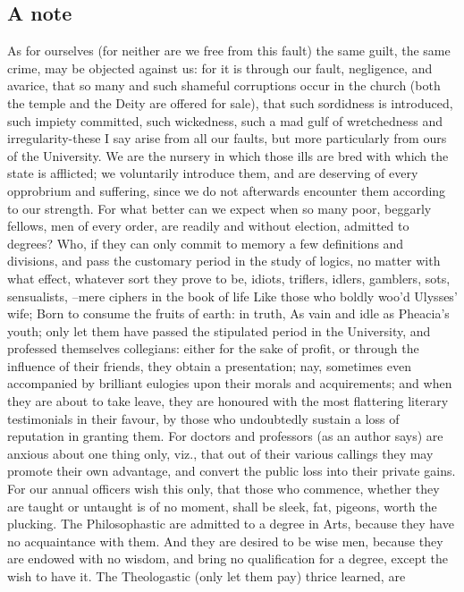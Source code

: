 {{\subsection{A note}
{
As for ourselves (for neither are we free from this fault) the same guilt, the
same crime, may be objected against us: for it is through our fault,
negligence, and avarice, that so many and such shameful corruptions occur in
the church (both the temple and the Deity are offered for sale), that such
sordidness is introduced, such impiety committed, such wickedness, such a mad
gulf of wretchedness and irregularity-these I say arise from all our faults,
but more particularly from ours of the University. We are the nursery in which
those ills are bred with which the state is afflicted; we voluntarily introduce
them, and are deserving of every opprobrium and suffering, since we do not
afterwards encounter them according to our strength. For what better can we
expect when so many poor, beggarly fellows, men of every order, are readily and
without election, admitted to degrees? Who, if they can only commit to memory a
few definitions and divisions, and pass the customary period in the study of
logics, no matter with what effect, whatever sort they prove to be, idiots,
triflers, idlers, gamblers, sots, sensualists, --mere ciphers in the book of
life Like those who boldly woo'd Ulysses' wife; Born to consume the fruits of
earth: in truth, As vain and idle as Pheacia's youth; only let them have passed
the stipulated period in the University, and professed themselves collegians:
either for the sake of profit, or through the influence of their friends, they
obtain a presentation; nay, sometimes even accompanied by brilliant eulogies
upon their morals and acquirements; and when they are about to take leave, they
are honoured with the most flattering literary testimonials in their favour, by
those who undoubtedly sustain a loss of reputation in granting them. For
doctors and professors (as an author says) are anxious about one thing only,
viz., that out of their various callings they may promote their own advantage,
and convert the public loss into their private gains. For our annual officers
wish this only, that those who commence, whether they are taught or untaught is
of no moment, shall be sleek, fat, pigeons, worth the plucking. The
Philosophastic are admitted to a degree in Arts, because they have no
acquaintance with them. And they are desired to be wise men, because they are
endowed with no wisdom, and bring no qualification for a degree, except the
wish to have it. The Theologastic (only let them pay) thrice learned, are
}}}

